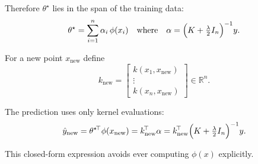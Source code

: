\documentclass[a4paper]{article}
\begin{document}
\noindent Therefore \(\theta^{\star}\) lies in the span of the training data:  
\[
\theta^{\star}=\sum_{i=1}^{n}\alpha_i\,\phi(x_i)
\quad\text{where}\quad
\alpha=\Bigl(K+\tfrac{\lambda}{2}I_n\Bigr)^{-1}y.
\]

\noindent For a new point \(x_{\text{new}}\) define  
\[
k_{\text{new}}=
\begin{bmatrix}
k(x_1,x_{\text{new}})\\[-2pt]
\vdots\\[-2pt]
k(x_n,x_{\text{new}})
\end{bmatrix}
\in\mathbb{R}^{n}.
\]

\noindent The prediction uses only kernel evaluations:  
\[
\hat{y}_{\text{new}}
= \theta^{\star\!\top}\phi(x_{\text{new}})
= k_{\text{new}}^{\!\top}\alpha
= k_{\text{new}}^{\!\top}\Bigl(K+\tfrac{\lambda}{2}I_n\Bigr)^{-1}y.
\]

\noindent This closed-form expression avoids ever computing \(\phi(x)\) explicitly.
\end{document}
